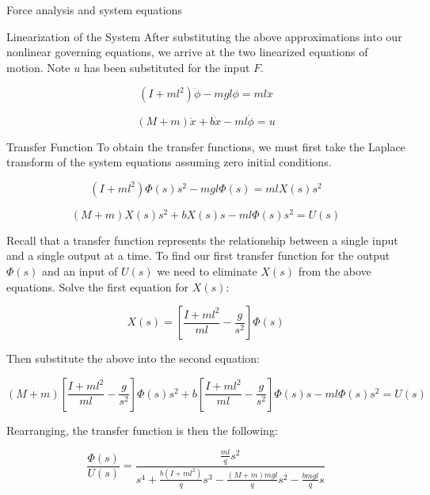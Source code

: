 \begin{frame}{Force analysis and system equations}
\begin{block}{Linearization of the System}
After substituting the above approximations into our nonlinear governing
equations, we arrive at the two linearized equations of motion. Note
\(u\) has been substituted for the input \(F\).

\begin{equation}
(I+ml^2)\ddot{\phi} - mgl\phi = ml\ddot{x}
\end{equation}

\begin{equation}
(M+m)\ddot{x} + b\dot{x} - ml\ddot{\phi} = u
\end{equation}
\end{block}

\begin{block}{Transfer Function}
\protect{}\label{transfer-function}
To obtain the transfer functions, we must first take the Laplace
transform of the system equations assuming zero initial conditions.

\begin{equation}
(I+ml^2)\Phi(s)s^2 - mgl\Phi(s) = mlX(s)s^2
\end{equation}

\begin{equation}
(M+m)X(s)s^2 + bX(s)s - ml\Phi(s)s^2 = U(s)
\end{equation}

Recall that a transfer function represents the relationship between a
single input and a single output at a time. To find our first transfer
function for the output \(\Phi(s)\) and an input of \(U(s)\) we need to
eliminate \(X(s)\) from the above equations. Solve the first equation
for \(X(s)\):

\begin{equation}
X(s) = \left[\frac{I+ml^2}{ml} - \frac{g}{s^2}\right]\Phi(s)
\end{equation}

Then substitute the above into the second equation:

\begin{equation}
(M+m)\left[\frac{I+ml^2}{ml} - \frac{g}{s^2}\right]\Phi(s)s^2 
+ b\left[\frac{I+ml^2}{ml} - \frac{g}{s^2}\right]\Phi(s)s 
- ml\Phi(s)s^2 = U(s)
\end{equation}

Rearranging, the transfer function is then the following:

\begin{equation}
\frac{\Phi(s)}{U(s)} = \frac{\tfrac{ml}{q}s^2}{s^4 + \tfrac{b(I+ml^2)}{q}s^3 - \tfrac{(M+m)mgl}{q}s^2 - \tfrac{bmgl}{q}s}
\end{equation}


\end{block}
\end{frame}

